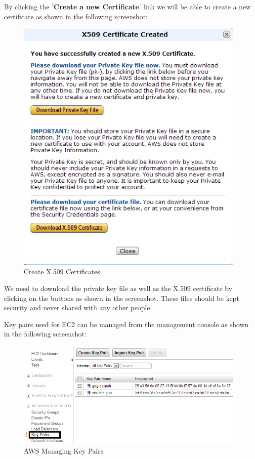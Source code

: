 By clicking the '\textbf{Create a new Certificate}' link we will be able to create a new certificate as shown in the following screenshot:
\begin{figure}[h]
  \centering
  \includegraphics[width=.8\textwidth]{figs/5163os_08_10.png}
  \caption{Create X.509 Certificates}\label{fig:aws.create.x509}
\end{figure} 

We need to download the private key file as well as the X.509 certificate by clicking on the buttons as shown in the screenshot. These files should be kept security and never shared with any other people.

Key pairs used for EC2 can be managed from the management console as shown in the following screenshot:
\begin{figure}[h]
  \centering
  \includegraphics[width=.8\textwidth]{figs/5163os_08_14.png}
  \caption{AWS Managing Key Pairs}\label{fig:aws.keypair.management}
\end{figure} 

